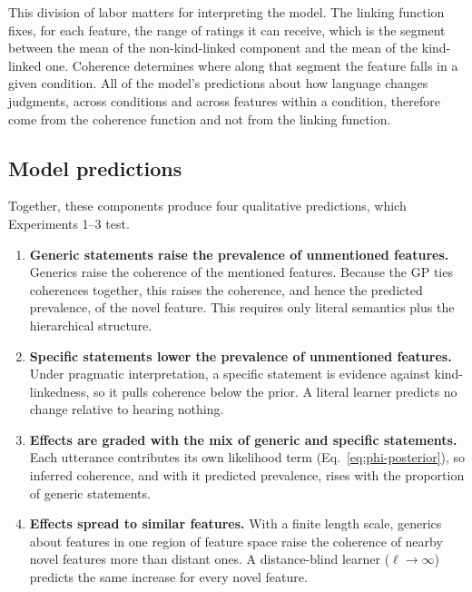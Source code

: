 This division of labor matters for interpreting the model. The linking function
fixes, for each feature, the range of ratings it can receive, which is the
segment between the mean of the non-kind-linked component and the mean of the
kind-linked one. Coherence determines where along that segment the feature falls
in a given condition. All of the model's predictions about how language changes
judgments, across conditions and across features within a condition, therefore
come from the coherence function and not from the linking function.

\subsection{Model predictions}
\label{sec:predictions}

Together, these components produce four qualitative predictions, which
Experiments 1--3 test.

\begin{enumerate}
    \item \textbf{Generic statements raise the prevalence of unmentioned
    features.} Generics raise the coherence of the mentioned features. Because
    the GP ties coherences together, this raises the coherence, and hence the
    predicted prevalence, of the novel feature. This requires only literal
    semantics plus the hierarchical structure.

    \item \textbf{Specific statements lower the prevalence of unmentioned
    features.} Under pragmatic interpretation, a specific statement is evidence
    against kind-linkedness, so it pulls coherence below the prior. A literal
    learner predicts no change relative to hearing nothing.

    \item \textbf{Effects are graded with the mix of generic and specific
    statements.} Each utterance contributes its own likelihood term
    (Eq.~\ref{eq:phi-posterior}), so inferred coherence, and with it predicted
    prevalence, rises with the proportion of generic statements.

    \item \textbf{Effects spread to similar features.} With a finite length
    scale, generics about features in one region of feature space raise the
    coherence of nearby novel features more than distant ones. A
    distance-blind learner ($\ell \to \infty$) predicts the same increase for
    every novel feature.
\end{enumerate}

